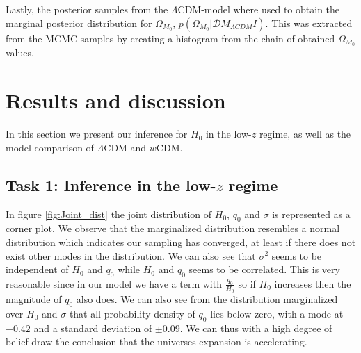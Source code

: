 \documentclass[11pt,a4paper]{article}
\begin{document}
Lastly, the posterior samples from the $\Lambda$CDM-model where used to obtain the marginal posterior distribution for $\Omega_{M_0}$, $p\left(\Omega_{M_0}\vert \mathcal{D} M_{\Lambda CDM} I\right)$. This was extracted from the MCMC samples by creating a histogram from the chain of obtained $\Omega_{M_0}$ values.

\section{Results and discussion}

In this section we present our inference for $H_0$ in the low-$z$ regime, as well as the model comparison of $\Lambda$CDM and $w$CDM.

\subsection[Task 1]{Task 1: Inference in the low-$z$ regime}
In figure \ref{fig:Joint_dist} the joint distribution of $H_0$, $q_0$ and $\sigma$ is represented as a corner plot. We observe that the marginalized distribution resembles a normal distribution which indicates our sampling has converged, at least if there does not exist other modes in the distribution. We can also see that $\sigma^2$ seems to be independent of $H_0$ and $q_0$ while $H_0$ and $q_0$ seems to be correlated. This is very reasonable since in our model we have a term with $\frac{q_0}{H_0}$ so if $H_0$ increases then the magnitude of $q_0$ also does. We can also see from the distribution marginalized over $H_0$ and $\sigma$ that all probability density of $q_0$ lies below zero, with a mode at $-0.42$ and a standard deviation of $\pm 0.09$. We can thus with a high degree of belief draw the conclusion that the universes expansion is accelerating.  

\end{document}
